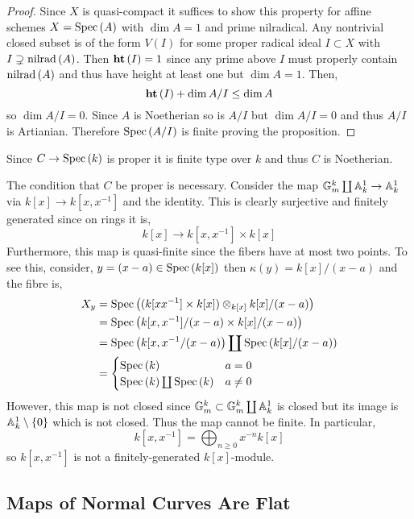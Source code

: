 \documentclass[12pt]{article}
\begin{document}
\begin{proof}
Since $X$ is quasi-compact it suffices to show this property for affine schemes $X = \mathrm{Spec}\left( A \right)$ with $\dim{A} = 1$ and prime nilradical. Any nontrivial closed subset is of the form $V(I)$ for some proper radical ideal $I \subset X$ with $I \supsetneq \mathrm{nilrad}\left( A \right)$. Then $\mathbf{ht}\left( I \right) = 1$ since any prime above $I$ must properly contain $\mathrm{nilrad}\left( A \right)$ and thus have height at least one but $\dim{A} = 1$. Then,
\[ \mathbf{ht}\left( I \right) + \dim{A / I} \le \dim{A} \]
so $\dim{A / I} = 0$. Since $A$ is Noetherian so is $A / I$ but $\dim{A / I} = 0$ and thus $A / I$ is Artianian. Therefore $\mathrm{Spec}\left( A / I \right)$ is finite proving the proposition. 
\end{proof}

\begin{remark}
Since $C \to \mathrm{Spec}\left( k \right)$ is proper it is finite type over $k$ and thus $C$ is Noetherian.
\end{remark}

\begin{rmk}
The condition that $C$ be proper is necessary.
Consider the map $\mathbb{G}_m^k \coprod \mathbb{A}^1_k \to \mathbb{A}^1_k$ via $k[x] \to k[x,x^{-1}]$ and the identity. This is clearly surjective and finitely generated since on rings it is,
\[ k[x] \to k[x, x^{-1}] \times k[x] \]
Furthermore, this map is quasi-finite since the fibers have at most two points. To see this, consider, $y = (x - a) \in \mathrm{Spec}\left( k[x] \right)$ then $\kappa(y) = k[x]/(x - a)$ and the fibre is,
\begin{align*}
X_y & = \mathrm{Spec}\left( (k[x x^{-1}] \times k[x]) \otimes_{k[x]} k[x]/(x  - a) \right) 
\\
& = \mathrm{Spec}\left( k[x, x^{-1}]/(x - a) \times k[x] / (x - a) \right) 
\\
& = \mathrm{Spec}\left( k[x, x^{-1}/(x - a) \right) \coprod \mathrm{Spec}\left( k[x]/(x - a) \right) 
\\
& = 
\begin{cases}
\mathrm{Spec}\left( k \right) & a = 0
\\
\mathrm{Spec}\left( k \right) \coprod \mathrm{Spec}\left( k \right) & a \neq 0
\end{cases}
\end{align*}
However, this map is not closed since $\mathbb{G}_m^k \subset \mathbb{G}_m^k \coprod \mathbb{A}^1_k$ is closed but its image is $\mathbb{A}^1_k \setminus \{ 0 \}$ which is not closed. Thus the map cannot be finite. In particular,
\[ k[x, x^{-1}] = \bigoplus_{n \ge 0} x^{-n} k[x] \]
so $k[x, x^{-1}]$ is not a finitely-generated $k[x]$-module.  
\end{rmk}

\subsection{Maps of Normal Curves Are Flat}
\end{document}
